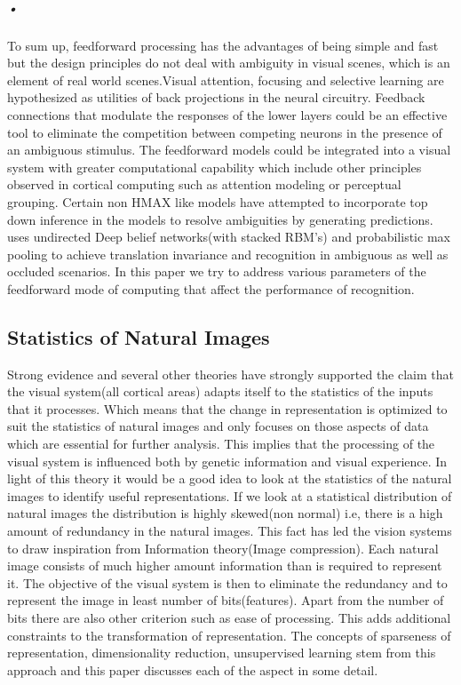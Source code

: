 \documentclass[12pt,twoside]{article}
\theoremstyle{plain}
\theoremstyle{definition}
\theoremstyle{remark}
\begin{document}
\subparagraph{•}
 To sum up, feedforward processing has the advantages of being simple and fast but the design principles do not deal with ambiguity in visual scenes, which is an element of real world scenes.Visual attention, focusing and selective learning are hypothesized as utilities of back projections in the neural circuitry. Feedback connections that modulate the responses of the lower layers could be an effective tool to eliminate the competition between competing neurons in the presence of an ambiguous stimulus. The feedforward models could be integrated into a visual system with greater computational capability which include other principles observed in cortical computing such as attention modeling or perceptual grouping\cite{Grossberg2007}. Certain non HMAX like models have attempted to incorporate top down inference in the models to resolve ambiguities by generating predictions.\cite{HonglakLee2009} uses undirected Deep belief networks(with stacked RBM's) and probabilistic max pooling\cite{HonglakLee2009} to achieve translation invariance and recognition in ambiguous as well as occluded scenarios. In this paper we try to address various parameters of the feedforward mode of computing that affect the performance of recognition.\\
 
\subsection{Statistics of Natural Images}
\label{Subsec:NatImStat}
Strong evidence\cite{BrunoA.Olshausen1996} and several other theories have strongly supported the claim that the visual system(all cortical areas) adapts itself to the statistics of the inputs that it processes. Which means that the change in representation is optimized to suit the statistics of natural images and only focuses on those aspects of data which are essential for further analysis\cite{AapoHyvaerinen2009}. This implies that the processing of the visual system is influenced both by genetic information and visual experience. In light of this theory it would be a good idea to look at the statistics of the natural images to identify useful representations. If we look at a statistical distribution of natural images the distribution is highly skewed(non normal) i.e, there is a high amount of redundancy in the natural images\cite{AapoHyvaerinen2009}. This fact has led the vision systems to draw inspiration from Information theory(Image compression). Each natural image consists of much higher amount information than is required to represent it. The objective of the visual system is then to eliminate the redundancy and to represent the image in least number of bits(features). Apart from the number of bits there are also other criterion such as ease of processing. This adds additional constraints to the transformation of representation. The concepts of sparseness of representation, dimensionality reduction, unsupervised learning stem from this approach and this paper discusses each of the aspect in some detail.
\end{document}
